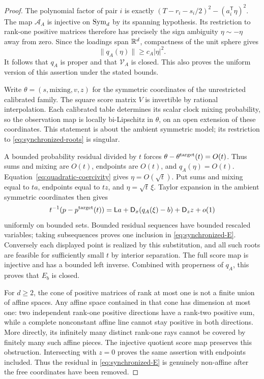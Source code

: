 \begin{proof}
The polynomial factor of pair $i$ is exactly
$(T-r_i-s_i/2)^2-(a_i^{\mathsf T}\eta)^2$.
The map $\mathcal A_A$ is injective on $\operatorname{Sym}_d$ by its spanning hypothesis. Its restriction to rank-one positive matrices therefore has precisely the sign ambiguity $\eta\sim-\eta$ away from zero. Since the loadings span $\mathbb R^d$, compactness of the unit sphere gives
\begin{equation}\label{eq:quadratic-coercivity}
 \|q_A(\eta)\|\ge c_A|\eta|^2.
\end{equation}
It follows that $q_A$ is proper and that $\mathcal V_A$ is closed. This also proves the uniform version of this assertion under the stated bounds.

Write $\theta=(s,\text{mixing},v,z)$ for the symmetric coordinates of the unrestricted calibrated family. The square score matrix $V$ is invertible by rational interpolation. Each calibrated table determines its scalar clock mixing probability, so the observation map is locally bi-Lipschitz in $\theta$, on an open extension of these coordinates. This statement is about the ambient symmetric model; its restriction to \eqref{eq:synchronized-roots} is singular.

A bounded probability residual divided by $t$ forces $\theta-\theta^{\rm target}(t)=O(t)$. Thus sums and mixing are $O(t)$, endpoints are $O(t)$, and $q_A(\eta)=O(t)$. Equation~\eqref{eq:quadratic-coercivity} gives $\eta=O(\sqrt t)$. Put sums and mixing equal to $ta$, endpoints equal to $tz$, and $\eta=\sqrt t\,\xi$. Taylor expansion in the ambient symmetric coordinates then gives
\[
 t^{-1}(p-p^{\rm target}(t))
 =\mathsf La+\mathsf D_x(q_A(\xi)-b)+\mathsf D_z z+o(1)
\]
uniformly on bounded sets. Bounded residual sequences have bounded rescaled variables; taking subsequences proves one inclusion in \eqref{eq:synchronized-E}. Conversely each displayed point is realized by this substitution, and all such roots are feasible for sufficiently small $t$ by interior separation. The full score map is injective and has a bounded left inverse. Combined with properness of $q_A$, this proves that $E_b$ is closed.

For $d\ge2$, the cone of positive matrices of rank at most one is not a finite union of affine spaces. Any affine space contained in that cone has dimension at most one: two independent rank-one positive directions have a rank-two positive sum, while a complete nonconstant affine line cannot stay positive in both directions. More directly, its infinitely many distinct rank-one rays cannot be covered by finitely many such affine pieces. The injective quotient score map preserves this obstruction. Intersecting with $z=0$ proves the same assertion with endpoints included. Thus the residual in \eqref{eq:synchronized-E} is genuinely non-affine after the free coordinates have been removed.


\end{proof}
